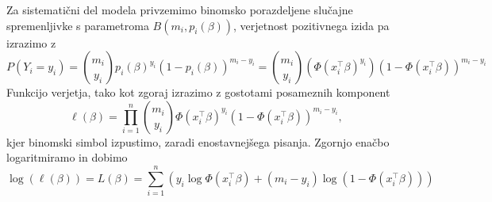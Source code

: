 \documentclass[12pt,a4paper]{amsart}
\theoremstyle{definition} %
\theoremstyle{plain} %
\begin{document}
Za sistematični del modela privzemimo binomsko porazdeljene slučajne spremenljivke s parametroma $B(m_{i},p_{i}(\beta))$,
verjetnost pozitivnega izida pa izrazimo z
\[
    P(Y_{i} = y_{i}) = \binom{m_{i}}{y_{i}}p_{i}(\beta)^{y_{i}}(1 - p_{i}(\beta))^{m_{i} - y_{i}} = \binom{m_{i}}{y_{i}} (\Phi(x_{i}^\top \beta)^{y_{i}})(1 - \Phi(x_{i}^\top \beta))^{m_{i} - y_{i}} 
\]
Funkcijo verjetja, tako kot zgoraj izrazimo z gostotami posameznih komponent
\[
    \ell(\beta) = \prod_{i=1}^{n} \binom{m_{i}}{y_{i}} \Phi(x_{i}^\top\beta)^{y_{i}}(1 - \Phi(x_{i}^\top\beta))^{m_{i} - y_{i}},
\]
kjer binomski simbol izpustimo, zaradi enostavnejšega pisanja. Zgornjo enačbo logaritmiramo in dobimo
\begin{equation}
    \log(\ell(\beta)) = L(\beta) = \sum_{i = 1}^{n}\left(y_{i}\log\Phi(x_{i}^\top\beta) + (m_{i} - y_{i})\log(1 - \Phi(x_{i}^\top\beta)) \right)
\end{equation}
\end{document}
